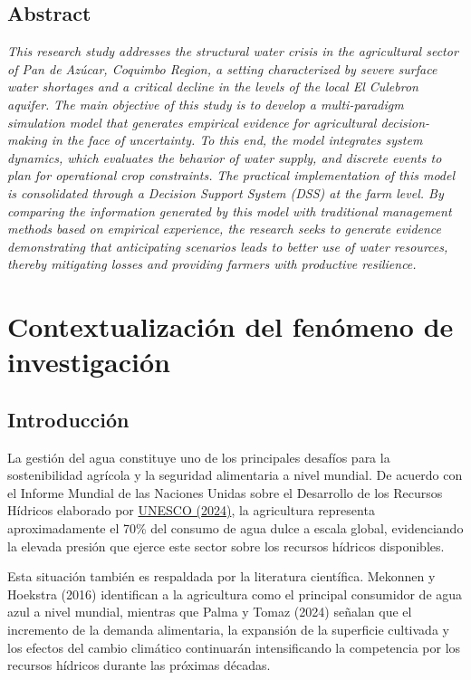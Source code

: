 \documentclass[12pt]{report}
\newcommand{\citeref}[2]{\hyperlink{ref:#1}{#2}}
\begin{document}
\vspace{0.5cm}

\section*{Abstract}
    \textit{This research study addresses the structural water crisis in the agricultural sector of Pan de Azúcar, Coquimbo Region, a setting characterized by severe surface water shortages and a critical decline in the levels of the local El Culebron aquifer.} \textit{The main objective of this study is to develop a multi-paradigm simulation model that generates empirical evidence for agricultural decision-making in the face of uncertainty. To this end, the model integrates system dynamics, which evaluates the behavior of water supply, and discrete events to plan for operational crop constraints.} \textit{The practical implementation of this model is consolidated through a Decision Support System (DSS) at the farm level. By comparing the information generated by this model with traditional management methods based on empirical experience, the research seeks to generate evidence demonstrating that anticipating scenarios leads to better use of water resources, thereby mitigating losses and providing farmers with productive resilience.}


\chapter{Contextualización del fenómeno de investigación}
\section{Introducción}

La gestión del agua constituye uno de los principales desafíos para la sostenibilidad agrícola y la seguridad alimentaria a nivel mundial. De acuerdo con el Informe Mundial de las Naciones Unidas sobre el Desarrollo de los Recursos Hídricos elaborado por \citeref{un2023}{UNESCO (2024)}, la agricultura representa aproximadamente el 70\% del consumo de agua dulce a escala global, evidenciando la elevada presión que ejerce este sector sobre los recursos hídricos disponibles.

Esta situación también es respaldada por la literatura científica. Mekonnen y Hoekstra (2016) identifican a la agricultura como el principal consumidor de agua azul a nivel mundial, mientras que Palma y Tomaz (2024) señalan que el incremento de la demanda alimentaria, la expansión de la superficie cultivada y los efectos del cambio climático continuarán intensificando la competencia por los recursos hídricos durante las próximas décadas.
\end{document}
